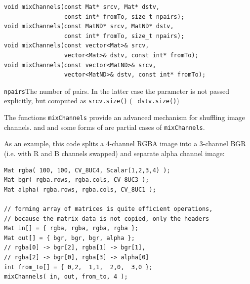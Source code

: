 \begin{lstlisting}
void mixChannels(const Mat* srcv, Mat* dstv,
                 const int* fromTo, size_t npairs);
void mixChannels(const MatND* srcv, MatND* dstv,
                 const int* fromTo, size_t npairs);
void mixChannels(const vector<Mat>& srcv,
                 vector<Mat>& dstv, const int* fromTo);
void mixChannels(const vector<MatND>& srcv,
                 vector<MatND>& dstv, const int* fromTo);
\end{lstlisting}
\begin{description}
\texttt{npairs}{The number of pairs. In the latter case the parameter is not passed explicitly, but computed as \texttt{srcv.size()} (=\texttt{dstv.size()})}
\end{description}

The functions \texttt{mixChannels} provide an advanced mechanism for shuffling image channels.  and  and some forms of  are partial cases of \texttt{mixChannels}.

As an example, this code splits a 4-channel RGBA image into a 3-channel
BGR (i.e. with R and B channels swapped) and separate alpha channel image:

\begin{lstlisting}
Mat rgba( 100, 100, CV_8UC4, Scalar(1,2,3,4) );
Mat bgr( rgba.rows, rgba.cols, CV_8UC3 );
Mat alpha( rgba.rows, rgba.cols, CV_8UC1 );

// forming array of matrices is quite efficient operations,
// because the matrix data is not copied, only the headers
Mat in[] = { rgba, rgba, rgba, rgba };
Mat out[] = { bgr, bgr, bgr, alpha };
// rgba[0] -> bgr[2], rgba[1] -> bgr[1],
// rgba[2] -> bgr[0], rgba[3] -> alpha[0]
int from_to[] = { 0,2,  1,1,  2,0,  3,0 };
mixChannels( in, out, from_to, 4 );
\end{lstlisting}

